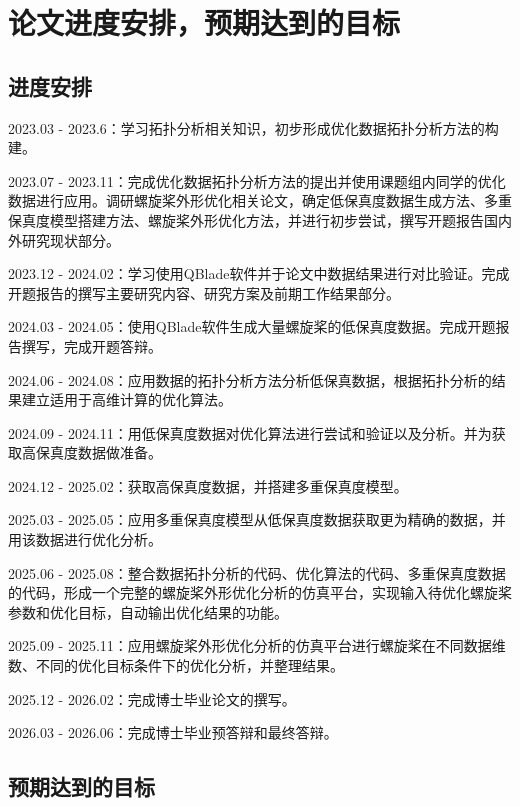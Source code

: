 \section{论文进度安排，预期达到的目标}\label{Sec: schedule}
\vspace{0.8em}


\vspace{0.8em}
\subsection{进度安排}\label{schedule}
\vspace{0.8em}

2023.03 - 2023.6：学习拓扑分析相关知识，初步形成优化数据拓扑分析方法的构建。

2023.07 - 2023.11：完成优化数据拓扑分析方法的提出并使用课题组内同学的优化数据进行应用。调研螺旋桨外形优化相关论文，确定低保真度数据生成方法、多重保真度模型搭建方法、螺旋桨外形优化方法，并进行初步尝试，撰写开题报告国内外研究现状部分。

2023.12 - 2024.02：学习使用QBlade软件并于论文中数据结果进行对比验证。完成开题报告的撰写主要研究内容、研究方案及前期工作结果部分。

2024.03 - 2024.05：使用QBlade软件生成大量螺旋桨的低保真度数据。完成开题报告撰写，完成开题答辩。

2024.06 - 2024.08：应用数据的拓扑分析方法分析低保真数据，根据拓扑分析的结果建立适用于高维计算的优化算法。

2024.09 - 2024.11：用低保真度数据对优化算法进行尝试和验证以及分析。并为获取高保真度数据做准备。

2024.12 - 2025.02：获取高保真度数据，并搭建多重保真度模型。

2025.03 - 2025.05：应用多重保真度模型从低保真度数据获取更为精确的数据，并用该数据进行优化分析。

2025.06 - 2025.08：整合数据拓扑分析的代码、优化算法的代码、多重保真度数据的代码，形成一个完整的螺旋桨外形优化分析的仿真平台，实现输入待优化螺旋桨参数和优化目标，自动输出优化结果的功能。

2025.09 - 2025.11：应用螺旋桨外形优化分析的仿真平台进行螺旋桨在不同数据维数、不同的优化目标条件下的优化分析，并整理结果。

2025.12 - 2026.02：完成博士毕业论文的撰写。

2026.03 - 2026.06：完成博士毕业预答辩和最终答辩。


\vspace{0.8em}
\subsection{预期达到的目标}\label{objectives}
\vspace{0.8em}

